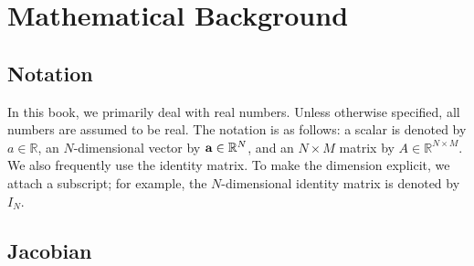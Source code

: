 \chapter{Mathematical Background}
\label{chap:数学的知識}

\section{Notation}

In this book, we primarily deal with real numbers.
Unless otherwise specified, all numbers are assumed to be real.
The notation is as follows: a scalar is denoted by $a \in \mathbb{R}$, an $N$-dimensional vector by ${\bf a} \in \mathbb{R}^{N}$, and an $N \times M$ matrix by $A \in \mathbb{R}^{N \times M}$.
We also frequently use the identity matrix.
To make the dimension explicit, we attach a subscript; for example, the $N$-dimensional identity matrix is denoted by $I_{N}$.














\section{Jacobian}


